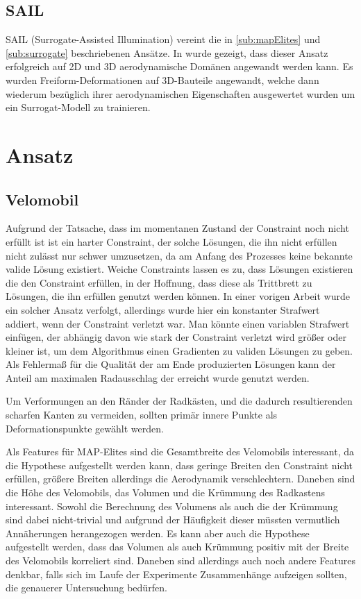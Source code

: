 \documentclass[12pt]{article}
\begin{document}
\subsection{SAIL}

SAIL (Surrogate-Assisted Illumination) vereint die in \ref{sub:mapElites} und \ref{sub:surrogate} beschriebenen Ansätze.
In \cite{Gaier.6152018} wurde gezeigt, dass dieser Ansatz erfolgreich auf 2D und 3D aerodynamische Domänen angewandt werden kann.
Es wurden Freiform-Deformationen auf 3D-Bauteile angewandt, welche dann wiederum bezüglich ihrer aerodynamischen Eigenschaften ausgewertet wurden um ein Surrogat-Modell zu trainieren.

\section{Ansatz}


\subsection{Velomobil}
Aufgrund der Tatsache, dass im momentanen Zustand der Constraint noch nicht erfüllt ist ist ein harter Constraint, der solche Lösungen, die ihn nicht erfüllen nicht zulässt nur schwer umzusetzen, da am Anfang des Prozesses keine bekannte valide Lösung existiert.
Weiche Constraints lassen es zu, dass Lösungen existieren die den Constraint erfüllen, in der Hoffnung, dass diese als Trittbrett zu Lösungen, die ihn erfüllen genutzt werden können.
In einer vorigen Arbeit wurde ein solcher Ansatz verfolgt, allerdings wurde hier ein konstanter Strafwert addiert, wenn der Constraint verletzt war.
Man könnte einen variablen Strafwert einfügen, der abhängig davon wie stark der Constraint verletzt wird größer oder kleiner ist, um dem Algorithmus einen Gradienten zu validen Lösungen zu geben.
Als Fehlermaß für die Qualität der am Ende produzierten Lösungen kann der Anteil am maximalen Radausschlag der erreicht wurde genutzt werden.

Um Verformungen an den Ränder der Radkästen, und die dadurch resultierenden scharfen Kanten zu vermeiden, sollten primär innere Punkte als Deformationspunkte gewählt werden.

Als Features für MAP-Elites sind die Gesamtbreite des Velomobils interessant, da die Hypothese aufgestellt werden kann, dass geringe Breiten den Constraint nicht erfüllen, größere Breiten allerdings die Aerodynamik verschlechtern.
Daneben sind die Höhe des Velomobils, das Volumen und die Krümmung des Radkastens interessant.
Sowohl die Berechnung des Volumens als auch die der Krümmung sind dabei nicht-trivial und aufgrund der Häufigkeit dieser müssten vermutlich Annäherungen herangezogen werden.
Es kann aber auch die Hypothese aufgestellt werden, dass das Volumen als auch Krümmung positiv mit der Breite des Velomobils korreliert sind.
Daneben sind allerdings auch noch andere Features denkbar, falls sich im Laufe der Experimente Zusammenhänge aufzeigen sollten, die genauerer Untersuchung bedürfen.
\end{document}
